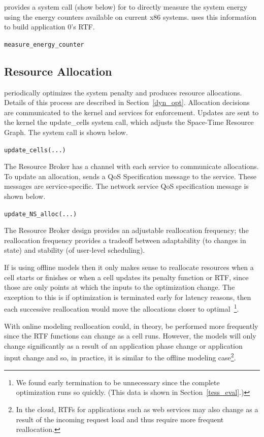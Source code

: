 \tess provides a system call (show below) for \pacora to directly measure the system energy using the energy counters available on current x86 systems.  \pacora uses this information to build application 0's RTF.

\texttt{measure\_energy\_counter}


\subsection{Resource Allocation}
\pacora periodically optimizes the system penalty and produces resource allocations.  Details of this process are described in Section~\ref{dyn_opt}.  Allocation decisions are communicated to the kernel and services for enforcement.  Updates are sent to the kernel the update\_cells system call, which adjusts the Space-Time Resource Graph.  The system call is shown below.

\texttt{update\_cells(...)}

The Resource Broker has a channel with each service to communicate allocations.  To update an allocation, \pacora sends a QoS Specification message to the service.  These messages are service-specific.  The network service QoS specification message is shown below.

\texttt{update\_NS\_alloc(...)}

The Resource Broker design provides an adjustable reallocation frequency; the reallocation frequency provides a tradeoff
between adaptability (to changes in state) and stability (of user-level
scheduling).  

If \pacora is using offline models then it only makes sense to reallocate resources when a cell starts or finishes or when a cell updates its penalty function or RTF, since those are only points at which the inputs to the optimization change.  The exception to this is if optimization is terminated early for latency reasons, then each successive reallocation would move the allocations closer to optimal~\footnote{We found early termination to be unnecessary since the complete optimization runs so quickly.  (This data is shown in Section~\ref{tess_eval}.)}. 

With online modeling reallocation could, in theory, be performed more frequently since the RTF functions can change as a cell runs.  However, the models will only change significantly as a result of an application phase change or application input change and so, in practice, it is similar to the offline modeling case\footnote{In the cloud, RTFs for applications such as web services may also change as a result of the incoming request load and thus require more frequent reallocation.}.

